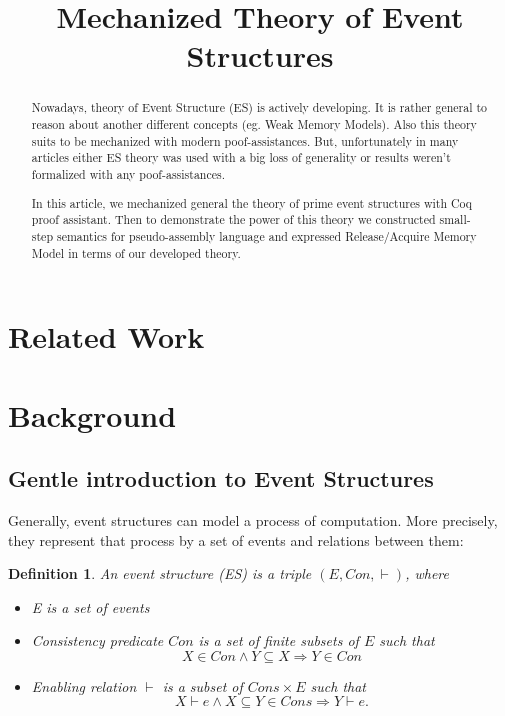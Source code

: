 \documentclass[conference]{IEEEtran}
\newtheorem{definition}{Definition}
\begin{document}
\title{Mechanized Theory of Event Structures}

\author{
\and
{}
\and
{}
\and
{}
}

\maketitle

\begin{abstract}


Nowadays, theory of Event Structure (ES) is actively developing. It is rather general to reason about another different  concepts (eg. Weak Memory Models). Also this theory suits to be mechanized with modern poof-assistances. But, unfortunately in many articles either ES theory was used with a big loss of generality or results weren't formalized with any poof-assistances.

In this article, we mechanized general the theory of prime event structures with Coq proof assistant. Then to demonstrate the power of this theory we constructed small-step semantics for pseudo-assembly language and expressed Release/Acquire Memory Model in terms of our developed theory.
\end{abstract}

\IEEEpeerreviewmaketitle



\section{Related Work}


\section{Background}

\subsection{Gentle introduction to Event Structures}

Generally, event structures can model a process of computation. More precisely, they represent that process by a set of events and relations between them: 
\begin{definition}
An event structure (ES) is a triple $(E, Con, \vdash)$, where
\begin{itemize}
    \item E is a set of events
    \item Consistency predicate $Con$ is a set of finite subsets of $E$ such that 
        $$ X \in Con \land Y \subseteq X \Longrightarrow Y \in Con $$
    \item Enabling relation $\vdash$ is a subset of $Cons \times E$ such that
        $$X \vdash e \land X \subseteq Y \in Cons \Longrightarrow Y \vdash e.$$
\end{itemize}
\end{definition}
\end{document}

